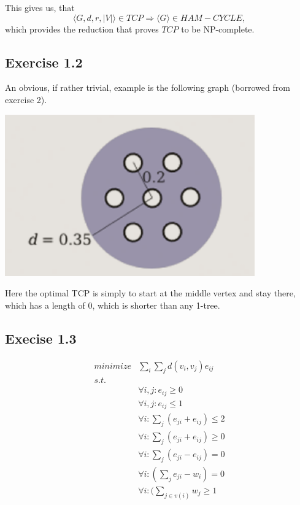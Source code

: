 \documentclass[11pt,a4paper]{article}
\begin{document}
This gives us, that
\[
    \langle G, d, r, |V| \rangle \in TCP \Rightarrow \langle G \rangle \in HAM-CYCLE,
\]
which provides the reduction that proves $TCP$ to be NP-complete.

\subsection{Exercise 1.2}
An obvious, if rather trivial, example is the following graph (borrowed from exercise 2).

\includegraphics[width=\textwidth]{tcp.png}

Here the optimal TCP is simply to start at the middle vertex and stay there, which has a length of 0, which is shorter than any 1-tree.

\subsection{Execise 1.3}
\begin{align*}
    minimize & \sum_i \sum_j d(v_i, v_j) e_{ij} \\
    s.t.     & \\
             & \forall i, j: e_{ij} \geq 0 \\
             & \forall i, j: e_{ij} \leq 1 \\
             & \forall i: \sum_j (e_{ji} + e_{ij}) \leq 2 \\
             & \forall i: \sum_j (e_{ji} + e_{ij}) \geq 0 \\
             & \forall i: \sum_j (e_{ji} - e_{ij}) = 0 \\
             & \forall i: (\sum_j e_{ji} - w_i) = 0 \\
             & \forall i: (\sum_{j \in v(i)} w_j \geq 1 \\
\end{align*}



\end{document}
